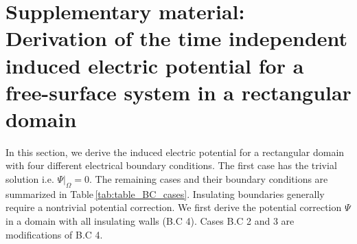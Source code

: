 \documentclass[aps,prfluids,reprint,superscriptaddress]{revtex4-2}
\numberwithin{equation}{section}
\begin{document}
\section{Supplementary material: Derivation of the time independent induced electric potential for a free-surface system in a rectangular domain}
\label{supplA}

In this section, we derive the induced electric potential for a rectangular domain with four different electrical boundary conditions. The first case has the trivial solution i.e. $\Psi|_{\Omega} = 0$. The remaining cases and their boundary conditions are summarized in Table\,\ref{tab:table_BC_cases}. Insulating boundaries generally require a nontrivial potential correction. We first derive the potential correction $\Psi$ in a domain with all insulating walls (B.C 4). Cases B.C 2 and 3 are modifications of B.C 4. 
\end{document}
